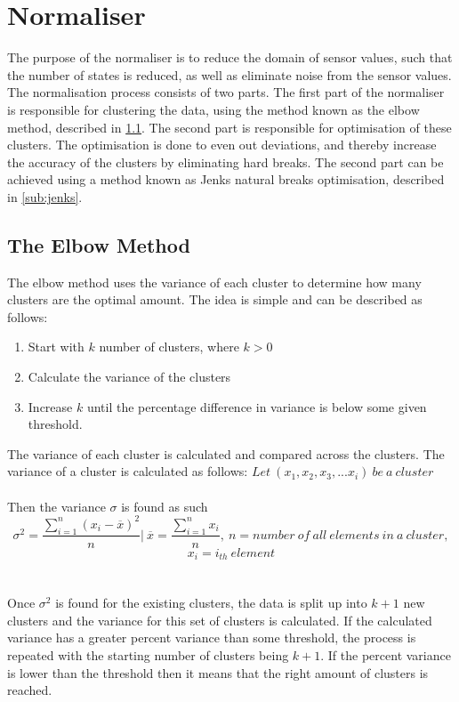 \section{Normaliser}
\label{sec:normaliser}
The purpose of the normaliser is to reduce the domain of sensor values, such that the number of states is reduced, as well as eliminate noise from the sensor values. The normalisation process consists of two parts. The first part of the normaliser is responsible for clustering the data, using the method known as the elbow method, described in \cref{sub:elbow_method}. The second part is responsible for optimisation of these clusters. The optimisation is done to even out deviations, and thereby increase the accuracy of the clusters by eliminating hard breaks. The second part can be achieved using a method known as Jenks natural breaks optimisation, described in \cref{sub:jenks}.

\subsection{The Elbow Method}
\label{sub:elbow_method}
The elbow method uses the variance of each cluster to determine how many clusters are the optimal amount. The idea is simple and can be described as follows:
\begin{enumerate}
\item Start with $k$ number of clusters, where $k>0$
\item Calculate the variance of the clusters
\item Increase $k$ until the percentage difference in variance is below some given threshold.
\end{enumerate}
The variance of each cluster is calculated and compared across the clusters. The variance of a cluster is calculated as follows:
$Let\ (x_1,x_2,x_3,...x_i) \ be \ a\ cluster $
\\\\Then the variance $\sigma$ is found as such
$$\sigma^2 = \frac{\displaystyle\sum_{i = 1}^{n}(x_{i}-\overline{x})^2 }{n} \Biggr\rvert\ \overline{x}  =\frac{\displaystyle\sum_{i=1}^{n}x_{i}}{n},\ n =number\ of\ all\ elements\ in\ a\ cluster ,$$
$$ x_{i} = i_{th}\ element $$
\\\\
Once $\sigma^2$ is found for the existing clusters, the data is split up into $k+1$ new clusters and the variance for this set of clusters is calculated. If the calculated variance has a greater percent variance than some threshold, the process is repeated with the starting number of clusters being $k+1$. If the percent variance is lower than the threshold then it means that the right amount of clusters is reached.
